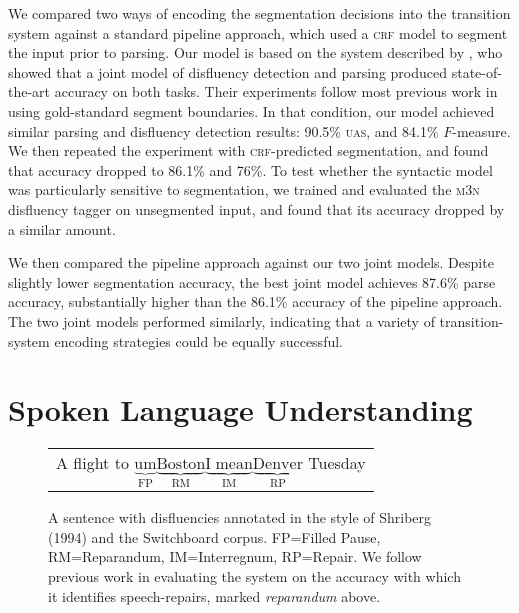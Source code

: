 \documentclass[11pt,letterpaper]{article}
\begin{document}
We compared two ways of encoding the segmentation decisions into the transition
system against a standard pipeline approach, which used a \textsc{crf} model
to segment the input prior to parsing.  Our model is based on the system described
by \citet{honnibal:14}, who showed that a joint model of disfluency detection
and parsing produced state-of-the-art accuracy on both tasks.
Their experiments follow most previous work in using gold-standard segment boundaries.
In that condition, our model achieved similar parsing and disfluency
detection results: 90.5\% \textsc{uas}, and 84.1\% $F$-measure.
We then repeated the experiment with \textsc{crf}-predicted segmentation,
and found that accuracy dropped to 86.1\% and 76\%.
To test whether the syntactic model was particularly sensitive to segmentation,
we trained and evaluated the \citet{qian:13} \textsc{m3n} disfluency tagger on
unsegmented input, and found that its accuracy dropped by a similar amount.

We then compared the pipeline approach against our two joint models.
Despite slightly lower segmentation accuracy,
the best joint
model achieves 87.6\% parse accuracy, substantially higher than the 86.1\%
accuracy of the pipeline approach.
The two joint models performed similarly, indicating that a variety of 
transition-system encoding strategies could be equally successful.


\section{Spoken Language Understanding}

\begin{figure}
    \begin{tabular}{l}

        A flight to $\underbrace{\mathrm{um}}_\text{FP} \underbrace{\mathrm{Boston}}_\text{RM} \underbrace{\mathrm{I\;mean}}_\text{IM} \underbrace{\mathrm{Denver}}_\text{RP}$ Tuesday\\

\end{tabular}
\caption{\small A sentence with disfluencies annotated in the style of Shriberg (1994) 
    and the Switchboard corpus.
FP=Filled Pause, RM=Reparandum, IM=Interregnum, RP=Repair.
We follow previous work in evaluating the system on the accuracy with which
it identifies speech-repairs, marked \emph{reparandum} above.
\label{fig:shriberg}}
\end{figure}
\end{document}
